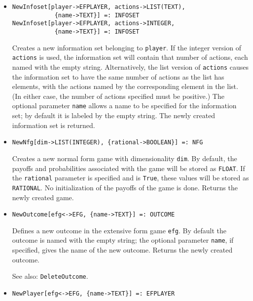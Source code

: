 \begin{itemize}
\item
\protect \large \begin{verbatim} 
NewInfoset[player->EFPLAYER, actions->LIST(TEXT),
            {name->TEXT}] =: INFOSET
NewInfoset[player->EFPLAYER, actions->INTEGER,
            {name->TEXT}] =: INFOSET
\end{verbatim}\normalsize

\bd
Creates a new information set belonging to \verb+player+.
If the integer version of \verb+actions+ is used, the information set
will contain that number of actions, each named with the empty string.
Alternatively, the list version of \verb+actions+ causes the information
set to have the same number of actions as the list has elements, with
the actions named by the corresponding element in the list.  (In either
case, the number of actions specified must be positive.)  The optional
parameter \verb+name+ allows a name to be specified for the information
set; by default it is labeled by the empty string.  The newly created
information set is returned.
\ed

\item
\protect \large \begin{verbatim}
NewNfg[dim->LIST(INTEGER), {rational->BOOLEAN}] =: NFG
\end{verbatim}\normalsize

\bd
Creates a new normal form game with dimensionality \verb+dim+.
By default, the payoffs and probabilities associated with the game will
be stored as {\tt FLOAT}.  If the \verb+rational+ parameter is specified
and is \verb+True+, these values will be stored as {\tt RATIONAL}.
No initialization of the payoffs of the game is done.
Returns the newly created game.
\ed

\item
\protect \large \begin{verbatim} 
NewOutcome[efg<->EFG, {name->TEXT}] =: OUTCOME
\end{verbatim}\normalsize

\bd
Defines a new outcome in the extensive form game \verb+efg+.
By default the outcome is named with the empty string; the optional parameter
\verb+name+, if specified, gives the name of the new outcome.  Returns the
newly created outcome.
\item
[See also:] {\tt DeleteOutcome}.
\ed

\item
\protect \large \begin{verbatim}
NewPlayer[efg<->EFG, {name->TEXT}] =: EFPLAYER 
\end{verbatim}\normalsize


\end{itemize}
